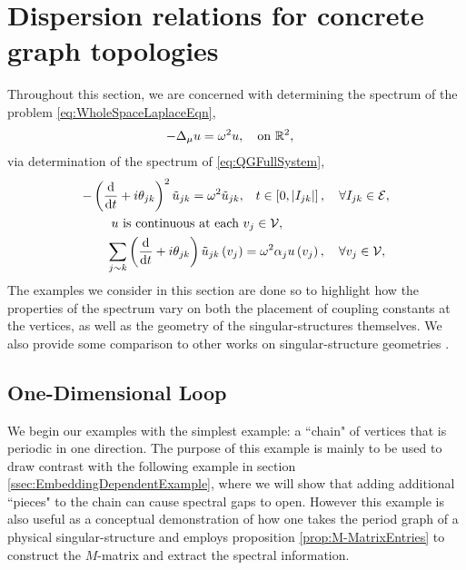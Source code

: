 \section{Dispersion relations for concrete graph topologies} \label{sec:Examples}
Throughout this section, we are concerned with determining the spectrum of the problem \eqref{eq:WholeSpaceLaplaceEqn},
\begin{align*}
	-\Delta_{\mu} u &= \omega^2 u, \quad\text{on } \mathbb{R}^2,
\end{align*}
via determination of the spectrum of \eqref{eq:QGFullSystem},
\begin{align*}
	-\left( \dfrac{\mathrm{d}}{\mathrm{d}t} + i\theta_{jk} \right)^2 \tilde{u}_{jk} = \omega^2 \tilde{u}_{jk}, &\quad t\in\left[ 0,\left\lvert I_{jk} \right\rvert \right], \quad \forall I_{jk}\in \mathcal{E}, \\
	u \text{ is continuous at each } &v_j \in \mathcal{V}, \\
	\sum_{j\sim k}\left( \dfrac{\mathrm{d}}{\mathrm{d}t} + i\theta_{jk} \right)\tilde{u}_{jk}\left( v_j \right) &= \omega^2\alpha_{j}u\left( v_j \right),  \quad \forall v_j \in \mathcal{V},
\end{align*}
The examples we consider in this section are done so to highlight how the properties of the spectrum vary on both the placement of coupling constants at the vertices, as well as the geometry of the singular-structures themselves. 
We also provide some comparison to other works on singular-structure geometries .

\subsection{One-Dimensional Loop} \label{ssec:Example1DLoop}
We begin our examples with the simplest example: a ``chain" of vertices that is periodic in one direction.
The purpose of this example is mainly to be used to draw contrast with the following example in section \ref{ssec:EmbeddingDependentExample}, where we will show that adding additional ``pieces" to the chain can cause spectral gaps to open.
However this example is also useful as a conceptual demonstration of how one takes the period graph of a physical singular-structure and employs proposition \ref{prop:M-MatrixEntries} to construct the $M$-matrix and extract the spectral information. \newline

